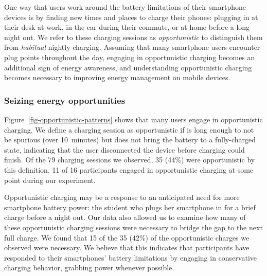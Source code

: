 One way that users work around the battery limitations of their smartphone
devices is by finding new times and places to charge their phones: plugging
in at their desk at work, in the car during their commute, or at home before
a long night out. We refer to these charging sessions as
\textit{opportunistic} to distinguish them from \textit{habitual} nightly
charging. Assuming that many smartphone users encounter plug points
throughout the day, engaging in opportunistic charging becomes an additional
sign of energy awareness, and understanding opportunistic charging becomes
necessary to improving energy management on mobile devices.

\subsubsection{Seizing energy opportunities}


Figure~\ref{fig-opportunistic-patterns} shows that many users engage in
opportunistic charging. We define a charging session as opportunistic if is
long enough to not be spurious (over 10~minutes) but does not bring the
battery to a fully-charged state, indicating that the user disconnected the
device before charging could finish. Of the 79 charging sessions we observed,
35 (44\%) were opportunistic by this definition. 11 of 16 participants
engaged in opportunistic charging at some point during our experiment.


Opportunistic charging may be a response to an anticipated need for more
smartphone battery power: the student who plugs her smartphone in for a brief
charge before a night out. Our data also allowed us to examine how many of
these opportunistic charging sessions were necessary to bridge the gap to the
next full charge. We found that 15 of the 35 (42\%) of the opportunistic
charges we observed were necessary. We believe that this indicates that
participants have responded to their smartphones' battery limitations by
engaging in conservative charging behavior, grabbing power whenever possible.

